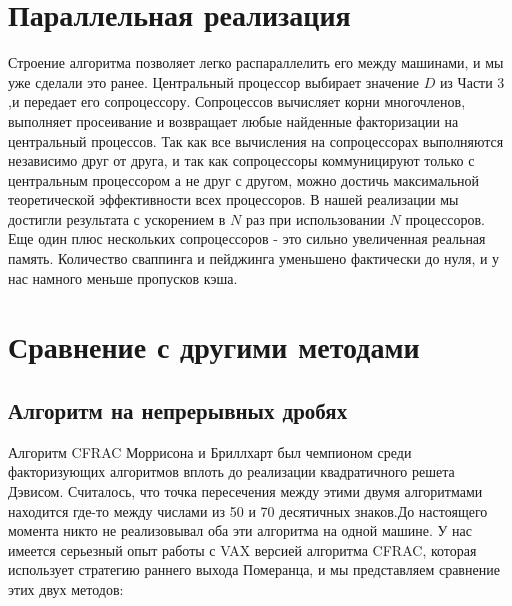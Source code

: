 \documentclass[a4paper,12pt]{report}
\begin{document}
\section{Параллельная реализация}

Строение алгоритма позволяет легко распараллелить его между машинами, и мы уже сделали это ранее. Центральный процессор выбирает значение $D$ из Части 3 ,и передает его сопроцессору. Сопроцессов вычисляет корни многочленов, выполняет просеивание и возвращает любые найденные факторизации на центральный процессов. Так как все вычисления на сопроцессорах выполняются независимо друг от друга, и так как сопроцессоры коммуницируют только с центральным процессором а не друг с другом, можно достичь максимальной теоретической эффективности всех процессоров. В нашей реализации мы достигли результата с ускорением в $N$ раз при использовании $N$ процессоров. Еще один плюс нескольких сопроцессоров - это сильно увеличенная реальная память. Количество сваппинга и пейджинга уменьшено фактически до нуля, и у нас намного меньше пропусков кэша.

\section{Сравнение с другими методами}

\subsection{Алгоритм на непрерывных дробях}
Алгоритм CFRAC Моррисона и Бриллхарт был чемпионом среди факторизующих алгоритмов вплоть до реализации квадратичного решета Дэвисом. Считалось, что точка пересечения между этими двумя алгоритмами находится где-то между числами из 50 и 70 десятичных знаков.До настоящего момента никто не реализовывал оба эти алгоритма на одной машине. У нас имеется серьезный опыт работы с VAX версией алгоритма CFRAC, которая использует стратегию раннего выхода Померанца, и мы представляем сравнение этих двух методов:
\end{document}
